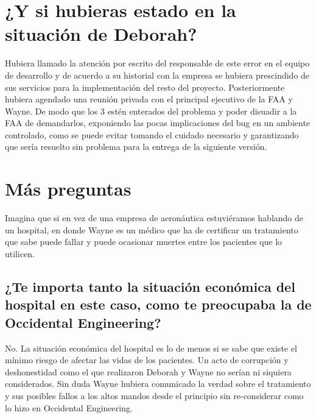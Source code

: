 \documentclass{article}
\begin{document}
\section{¿Y si hubieras estado en la situación de Deborah?}
Hubiera llamado la atención por escrito del responsable de este
error en el equipo de desarrollo y de acuerdo a su historial
con la empresa se hubiera prescindido de sus servicios para la
implementación del resto del proyecto. Posteriormente hubiera
agendado una reunión privada con el principal ejecutivo de la FAA 
y Wayne. De modo que los 3 estén enterados del problema y poder
disuadir a la FAA de demandarlos, exponiendo las pocas implicaciones
del bug en un ambiente controlado, como se puede evitar tomando
el cuidado necesario y garantizando que sería resuelto sin problema
para la entrega de la siguiente versión.

\section{Más preguntas}
Imagina que si en vez de una empresa de aeronáutica estuviéramos
hablando de un hospital, en donde Wayne es un médico que ha de
certificar un tratamiento que sabe puede fallar y puede ocasionar
muertes entre los pacientes que lo utilicen.

\subsection{¿Te importa tanto la situación económica del hospital
        en este caso, como te preocupaba la de Occidental
        Engineering?}
No. La situación económica del hospital es lo de menos si se sabe
que existe el mínimo riesgo de afectar las vidas de los pacientes.
Un acto de corrupción y deshonestidad como el que realizaron 
Deborah y Wayne no serían ni siquiera considerados. Sin duda Wayne
hubiera comunicado la verdad sobre el tratamiento y sus posibles
fallos a los altos mandos desde el principio sin re-considerar como
lo hizo en Occidental Engineering.
\end{document}
